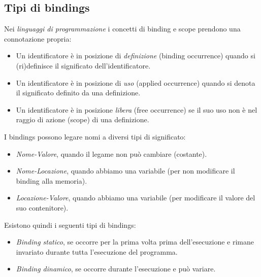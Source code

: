 \documentclass[a4paper,oneside,titlepage]{book}
\begin{document}
\subsection{Tipi di bindings}
Nei \textit{linguaggi di programmazione} i concetti di binding e scope prendono una connotazione propria:
\begin{itemize}
	\item Un identificatore è in posizione di \textit{definizione} (binding occurrence) quando si (ri)definisce il significato dell'identificatore.
	\item Un identificatore è in posizione di \textit{uso} (applied occurrence) quando si denota il significato definito da una definizione.
	\item Un identificatore è in posizione \textit{libera} (free occurrence) se il suo uso non è nel raggio di azione (scope) di una definizione.
\end{itemize}
I bindings possono legare nomi a diversi tipi di significato:
\begin{itemize}
	\item \textit{Nome-Valore}, quando il legame non può cambiare (costante).
	\item \textit{Nome-Locazione}, quando abbiamo una variabile (per non modificare il binding alla memoria).
	\item \textit{Locazione-Valore}, quando abbiamo una variabile (per modificare il valore del suo contenitore).
\end{itemize}
Esistono quindi i seguenti tipi di bindings:
\begin{itemize}
	\item \textit{Binding statico}, se occorre per la prima volta prima dell'esecuzione e rimane invariato durante tutta l'esecuzione del programma.
	\item \textit{Binding dinamico}, se occorre durante l'esecuzione e può variare.
\end{itemize}
\end{document}
